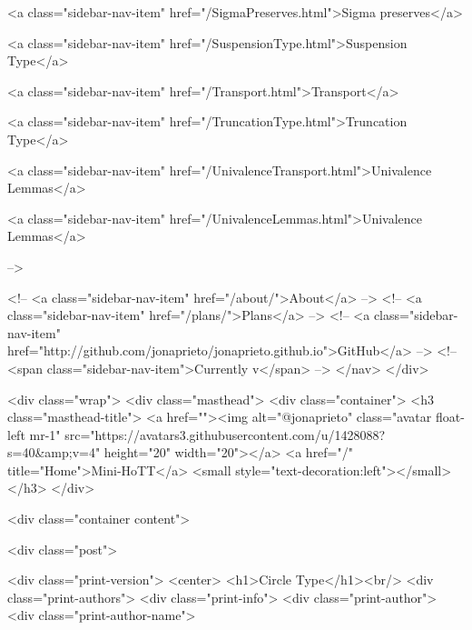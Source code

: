       
        
          <a class="sidebar-nav-item" href="/SigmaPreserves.html">Sigma preserves</a>
        
      
    
      
        
          <a class="sidebar-nav-item" href="/SuspensionType.html">Suspension Type</a>
        
      
    
      
        
          <a class="sidebar-nav-item" href="/Transport.html">Transport</a>
        
      
    
      
        
          <a class="sidebar-nav-item" href="/TruncationType.html">Truncation Type</a>
        
      
    
      
        
          <a class="sidebar-nav-item" href="/UnivalenceTransport.html">Univalence Lemmas</a>
        
      
    
      
        
          <a class="sidebar-nav-item" href="/UnivalenceLemmas.html">Univalence Lemmas</a>
        
      
     -->

    <!-- <a class="sidebar-nav-item" href="/about/">About</a> -->
    <!-- <a class="sidebar-nav-item" href="/plans/">Plans</a> -->
    <!-- <a class="sidebar-nav-item" href="http://github.com/jonaprieto/jonaprieto.github.io">GitHub</a> -->
    <!-- <span class="sidebar-nav-item">Currently v</span> -->
  </nav>
</div>

    <div class="wrap">
      <div class="masthead">
        <div class="container">
          <h3 class="masthead-title">
            <a href=""><img alt="@jonaprieto" class="avatar float-left mr-1" src="https://avatars3.githubusercontent.com/u/1428088?s=40&amp;v=4" height="20" width="20"></a>
            <a href="/" title="Home">Mini-HoTT</a>
            <small style="text-decoration:left"></small>
          </h3>
        </div>
      
      <div class="container content">
        







<div class="post">

  <div class="print-version">
    <center>
      <h1>Circle Type</h1><br/>
        <div class="print-authors">
          <div class="print-info">
            <div class="print-author">
              <div class="print-author-name">
                
